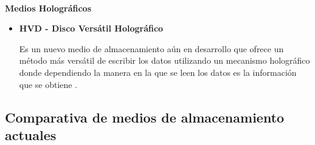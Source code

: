 \textbf{\\ Medios Hologr\'{a}ficos \\}

\begin{itemize}

  \item \textbf{HVD - Disco Vers\'{a}til Hologr\'{a}fico}
  
  Es un nuevo medio de almacenamiento a\'{u}n en desarrollo que ofrece un m\'{e}todo m\'{a}s vers\'{a}til de escribir los datos utilizando un mecanismo hologr\'{a}fico donde dependiendo la manera en la que se leen los datos es la informaci\'{o}n que se obtiene \cite{_worlds_2004}.
  
\end{itemize}

      \subsection {Comparativa de medios de almacenamiento actuales}

